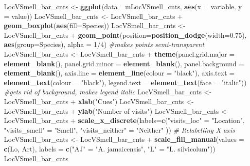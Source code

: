 \documentclass[]{article}
\newenvironment{Shaded}{\begin{snugshade}}{\end{snugshade}}
\newcommand{\KeywordTok}[1]{\textcolor[rgb]{0.13,0.29,0.53}{\textbf{{#1}}}}
\newcommand{\DataTypeTok}[1]{\textcolor[rgb]{0.13,0.29,0.53}{{#1}}}
\newcommand{\DecValTok}[1]{\textcolor[rgb]{0.00,0.00,0.81}{{#1}}}
\newcommand{\FloatTok}[1]{\textcolor[rgb]{0.00,0.00,0.81}{{#1}}}
\newcommand{\StringTok}[1]{\textcolor[rgb]{0.31,0.60,0.02}{{#1}}}
\newcommand{\CommentTok}[1]{\textcolor[rgb]{0.56,0.35,0.01}{\textit{{#1}}}}
\newcommand{\NormalTok}[1]{{#1}}
\begin{document}
\begin{Shaded}
\begin{Highlighting}[]
\NormalTok{LocVSmell_bar_cnts <-}\StringTok{ }\KeywordTok{ggplot}\NormalTok{(}\DataTypeTok{data =}\NormalTok{mLocVSmell_cnts, }\KeywordTok{aes}\NormalTok{(}\DataTypeTok{x =} \NormalTok{variable, }\DataTypeTok{y =} \NormalTok{value))}
\NormalTok{LocVSmell_bar_cnts <-}\StringTok{ }\NormalTok{LocVSmell_bar_cnts +}\StringTok{ }\KeywordTok{geom_boxplot}\NormalTok{(}\KeywordTok{aes}\NormalTok{(}\DataTypeTok{fill=}\NormalTok{Species))}
\NormalTok{LocVSmell_bar_cnts <-}\StringTok{ }\NormalTok{LocVSmell_bar_cnts +}\StringTok{ }\KeywordTok{geom_point}\NormalTok{(}\DataTypeTok{position=}\KeywordTok{position_dodge}\NormalTok{(}\DataTypeTok{width=}\FloatTok{0.75}\NormalTok{), }\KeywordTok{aes}\NormalTok{(}\DataTypeTok{group=}\NormalTok{Species), }\DataTypeTok{alpha =} \DecValTok{1}\NormalTok{/}\DecValTok{4}\NormalTok{) }\CommentTok{#makes points semi-transparent}
\NormalTok{LocVSmell_bar_cnts <-}\StringTok{ }\NormalTok{LocVSmell_bar_cnts +}\StringTok{ }\KeywordTok{theme}\NormalTok{(}\DataTypeTok{panel.grid.major =} \KeywordTok{element_blank}\NormalTok{(), }\DataTypeTok{panel.grid.minor =} \KeywordTok{element_blank}\NormalTok{(),}
\DataTypeTok{panel.background =} \KeywordTok{element_blank}\NormalTok{(), }\DataTypeTok{axis.line =} \KeywordTok{element_line}\NormalTok{(}\DataTypeTok{colour =} \StringTok{"black"}\NormalTok{), }\DataTypeTok{axis.text =} \KeywordTok{element_text}\NormalTok{(}\DataTypeTok{colour =} \StringTok{"black"}\NormalTok{), }\DataTypeTok{legend.text =} \KeywordTok{element_text}\NormalTok{(}\DataTypeTok{face =} \StringTok{"italic"}\NormalTok{))  }\CommentTok{#gets rid of background, makes legend italic}
\NormalTok{LocVSmell_bar_cnts <-}\StringTok{ }\NormalTok{LocVSmell_bar_cnts +}\StringTok{ }\KeywordTok{xlab}\NormalTok{(}\StringTok{"Cues"}\NormalTok{)}
\NormalTok{LocVSmell_bar_cnts <-}\StringTok{ }\NormalTok{LocVSmell_bar_cnts +}\StringTok{ }\KeywordTok{ylab}\NormalTok{(}\StringTok{"Number of visits"}\NormalTok{)}
\NormalTok{LocVSmell_bar_cnts <-}\StringTok{ }\NormalTok{LocVSmell_bar_cnts +}\StringTok{ }\KeywordTok{scale_x_discrete}\NormalTok{(}\DataTypeTok{labels=}\KeywordTok{c}\NormalTok{(}\StringTok{"visits_loc"} \NormalTok{=}\StringTok{ "Location"}\NormalTok{, }\StringTok{"visits_smell"} \NormalTok{=}\StringTok{ "Smell"}\NormalTok{,}
                              \StringTok{"visits_neither"} \NormalTok{=}\StringTok{ "Neither"} \NormalTok{))  }\CommentTok{# Relabelling X axis}
\NormalTok{LocVSmell_bar_cnts <-}\StringTok{ }\NormalTok{LocVSmell_bar_cnts +}\StringTok{  }\KeywordTok{scale_fill_manual}\NormalTok{(}\DataTypeTok{values =} \KeywordTok{c}\NormalTok{(Lo, Art), }\DataTypeTok{labels =} \KeywordTok{c}\NormalTok{(}\StringTok{"AJ"} \NormalTok{=}\StringTok{ "A. jamaicensis"}\NormalTok{, }\StringTok{"L"} \NormalTok{=}\StringTok{ "L. silvicolum"}\NormalTok{))}
\NormalTok{LocVSmell_bar_cnts}
\end{Highlighting}
\end{Shaded}
\end{document}
